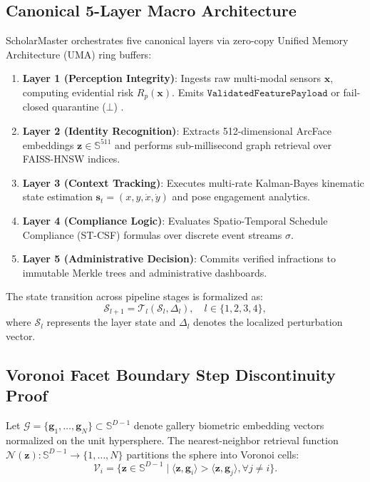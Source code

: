 \documentclass[conference]{IEEEtran}
\begin{document}
\subsection{Canonical 5-Layer Macro Architecture}
ScholarMaster orchestrates five canonical layers via zero-copy Unified Memory Architecture (UMA) ring buffers:
\begin{enumerate}
    \item \textbf{Layer 1 (Perception Integrity)}: Ingests raw multi-modal sensors $\mathbf{x}$, computing evidential risk $R_p(\mathbf{x})$. Emits $\mathtt{ValidatedFeaturePayload}$ or fail-closed quarantine ($\bot$) \cite{kumar2026scholar22}.
    \item \textbf{Layer 2 (Identity Recognition)}: Extracts 512-dimensional ArcFace embeddings $\mathbf{z} \in \mathbb{S}^{511}$ and performs sub-millisecond graph retrieval over FAISS-HNSW indices.
    \item \textbf{Layer 3 (Context Tracking)}: Executes multi-rate Kalman-Bayes kinematic state estimation $\mathbf{s}_t = (x, y, \dot{x}, \dot{y})$ and pose engagement analytics.
    \item \textbf{Layer 4 (Compliance Logic)}: Evaluates Spatio-Temporal Schedule Compliance (ST-CSF) formulas over discrete event streams $\sigma$.
    \item \textbf{Layer 5 (Administrative Decision)}: Commits verified infractions to immutable Merkle trees and administrative dashboards.
\end{enumerate}

The state transition across pipeline stages is formalized as:
\begin{equation}
\mathcal{S}_{l+1} = \mathcal{T}_l(\mathcal{S}_l, \Delta_l), \quad l \in \{1, 2, 3, 4\},
\end{equation}
where $\mathcal{S}_l$ represents the layer state and $\Delta_l$ denotes the localized perturbation vector.

\subsection{Voronoi Facet Boundary Step Discontinuity Proof}
Let $\mathcal{G} = \{\mathbf{g}_1, \dots, \mathbf{g}_N\} \subset \mathbb{S}^{D-1}$ denote gallery biometric embedding vectors normalized on the unit hypersphere. The nearest-neighbor retrieval function $\mathcal{N}(\mathbf{z}): \mathbb{S}^{D-1} \to \{1, \dots, N\}$ partitions the sphere into Voronoi cells:
\begin{equation}
\mathcal{V}_i = \{ \mathbf{z} \in \mathbb{S}^{D-1} \mid \langle \mathbf{z}, \mathbf{g}_i \rangle > \langle \mathbf{z}, \mathbf{g}_j \rangle, \forall j \neq i \}.
\end{equation}
\end{document}
